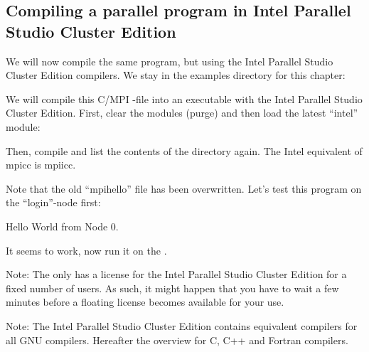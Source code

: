 \begin{prompt}
\end{prompt}

\subsection{Compiling a parallel program in Intel Parallel Studio Cluster Edition}

We will now compile the same program, but using the Intel Parallel Studio
Cluster Edition compilers. We stay in the examples directory for this chapter:

\begin{prompt}
\end{prompt}

We will compile this C/MPI -file into an executable with the Intel Parallel Studio
Cluster Edition. First, clear the modules (purge) and then load the latest
``intel'' module:

\begin{prompt}
\end{prompt}

Then, compile and list the contents of the directory again. The Intel
equivalent of mpicc is mpiicc.

\begin{prompt}
\end{prompt}

Note that the old ``mpihello'' file has been overwritten.
Let's test this program on the ``login''-node first:

\begin{prompt}
Hello World from Node 0.
\end{prompt}

It seems to work, now run it on the \hpc.

\begin{prompt}
\end{prompt}

Note: The \association only has a license for the Intel Parallel Studio Cluster Edition for a
fixed number of users. As such, it might happen that you have to wait a few
minutes before a floating license becomes available for your use.

Note: The Intel Parallel Studio Cluster Edition contains equivalent compilers for all GNU
compilers. Hereafter the overview for C, C++ and Fortran compilers.

